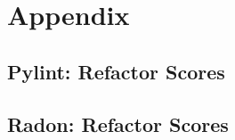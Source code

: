 \setcounter{chapter}{7}

\chapter*{Appendix} \label{chapterAppendix}

\section{Pylint: Refactor Scores} \label{appendixPylintRefactor}

\section{Radon: Refactor Scores} \label{appendixRadonRefactor}
